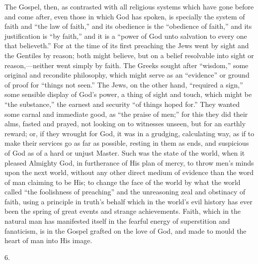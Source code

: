 The Gospel, then, as contrasted with all religious systems which
have gone before and come after, even those in which God has spoken,
is specially the system of faith and ``the law of faith,'' and
its obedience is the ``obedience of faith,'' and its
justification is ``by faith,'' and it is a ``power of God
unto salvation to every one that believeth.'' For at the time of
its first preaching the Jews went by sight and the Gentiles by reason;
both might believe, but on a belief resolvable into sight or reason,—neither
went simply by faith. The Greeks sought after ``wisdom,'' some
original and recondite philosophy, which might serve as an
``evidence'' or ground of proof for ``things not
seen.'' The Jews, on the other hand, ``required a sign,''
some sensible display of God's power, a thing of sight and touch,
which might be ``the substance,'' the earnest and security
``of things hoped for.'' They wanted some carnal and immediate
good, as ``the praise of men;'' for this they did their alms,
fasted and prayed, not looking on to witnesses unseen, but for an
earthly reward; or, if they wrought for God, it was in a grudging,
calculating way, as if to make their services go as far as possible,
resting in them as ends, and suspicious of God as of a hard or
unjust Master. Such was the state of the world, when it pleased
Almighty God, in furtherance of His plan of mercy, to throw men's
minds upon the next world, without any other direct medium of evidence
than the word of man claiming to be His; to change the face of the
world by what the world called ``the foolishness of
preaching'' and the unreasoning zeal and obstinacy of faith, using
a principle in truth's behalf which in the world's evil history has
ever been the spring of great events and strange achievements. Faith,
which in the natural man has manifested itself in the fearful energy
of superstition and fanaticism, is in the Gospel grafted on the love
of God, and made to mould the heart of man into His image.

6.

